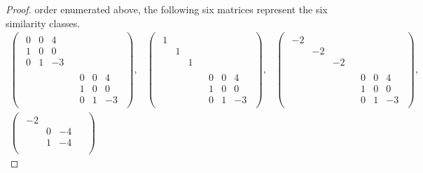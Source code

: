 \documentclass{./typewriter-math}
\begin{document}
\begin{exercise}[(DF 12.2.10)]
\begin{proof}
			order enumerated above, the following six matrices represent the six
			similarity classes.%
			\[%
				\begin{array}{ccc}%
					\begin{pmatrix}
						\begin{matrix}
							0 & 0 & 4\\
							1 & 0 & 0\\
							0 & 1 & -3
						\end{matrix} & \\
						& \begin{matrix}
							0 & 0 & 4\\
							1 & 0 & 0\\
							0 & 1 & -3
						\end{matrix}
					\end{pmatrix},&
					\begin{pmatrix}
						\begin{matrix}
							1 &  & \\
							 & 1 & \\
							 &  & 1
						\end{matrix} & \\
						& \begin{matrix}
							0 & 0 & 4\\
							1 & 0 & 0\\
							0 & 1 & -3
						\end{matrix}
					\end{pmatrix},&
					\begin{pmatrix}
						\begin{matrix}
							-2 &   &  \\
							  & -2 &  \\
							  &   & -2
						\end{matrix} & \\
						& \begin{matrix}
							0 & 0 & 4\\
							1 & 0 & 0\\
							0 & 1 & -3
						\end{matrix}
					\end{pmatrix},\\[0.5in]
					\begin{pmatrix}
						\begin{matrix}
							-2 &   &  \\
							  & 0 & -4\\
							  & 1 & -4
						\end{matrix} & \\

\end{pmatrix}
\end{array}\]
\end{proof}
\end{exercise}
\end{document}
